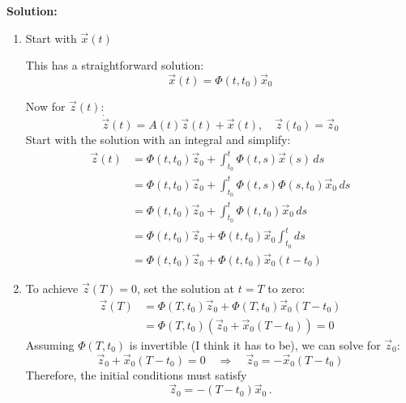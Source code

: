 \documentclass[12pt]{article}
\newenvironment{solution}{
    \textbf{Solution:}
    
}{
    
    \vspace{2em}
}
\begin{document}
\begin{solution}
    \begin{enumerate}[label=\alph*)]
        \item Start with \(\vec{x}(t)\)
    
        This has a straightforward solution:
        \[
            \vec{x}(t) = \Phi(t, t_0) \vec{x}_0
        \]
    
        Now for \(\vec{z}(t)\):
        \[
            \dot{\vec{z}}(t) = A(t)\vec{z}(t) + \vec{x}(t), \quad \vec{z}(t_0) = \vec{z}_0
        \]
        Start with the solution with an integral and simplify:
        \[
            \begin{aligned}
                \vec{z}(t) &= \Phi(t, t_0) \vec{z}_0 + \int_{t_0}^{t} \Phi(t, s) \vec{x}(s) \, ds \\
                &= \Phi(t, t_0) \vec{z}_0 + \int_{t_0}^{t} \Phi(t, s) \Phi(s, t_0) \vec{x}_0 \, ds\\
                &= \Phi(t, t_0) \vec{z}_0 + \int_{t_0}^{t} \Phi(t, t_0) \vec{x}_0 \, ds\\
                &= \Phi(t, t_0) \vec{z}_0 + \Phi(t, t_0) \vec{x}_0 \int_{t_0}^{t} ds\\
                &= \Phi(t, t_0) \vec{z}_0 + \Phi(t, t_0) \vec{x}_0 (t - t_0)
            \end{aligned}
        \]
        \item To achieve \(\vec{z}(T) = 0\), set the solution at \(t = T\) to zero:
        \[
            \begin{aligned}
                \vec{z}(T) &= \Phi(T, t_0) \vec{z}_0 + \Phi(T, t_0) \vec{x}_0 (T - t_0)\\
                &= \Phi(T, t_0) (\vec{z}_0 + \vec{x}_0 (T - t_0)) = 0
            \end{aligned}
        \]
        Assuming \(\Phi(T, t_0)\) is invertible (I think it has to be), we can solve for \(\vec{z}_0\):
        \[
            \vec{z}_0 + \vec{x}_0 (T - t_0) = 0 \quad \Rightarrow \quad \vec{z}_0 = -\vec{x}_0 (T - t_0)
        \]
        Therefore, the initial conditions must satisfy
        \[
            \vec{z}_0 = - (T - t_0) \vec{x}_0\,.
        \]
    \end{enumerate}
\end{solution}

\newpage
\end{document}

